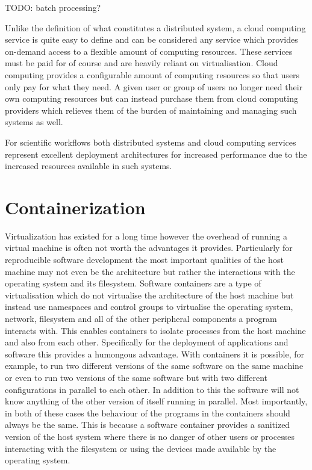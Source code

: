 TODO: batch processing?

Unlike the definition of what constitutes a distributed system, a cloud computing service is quite easy to define and can be considered any service which provides on-demand access to a flexible amount of computing resources. These services must be paid for of course and are heavily reliant on virtualisation. Cloud computing provides a configurable amount of computing resources so that users only pay for what they need. A given user or group of users no longer need their own computing resources but can instead purchase them from cloud computing providers which relieves them of the burden of maintaining and managing such systems as well. 

For scientific workflows both distributed systems and cloud computing services represent excellent deployment architectures for increased performance due to the increased resources available in such systems.

\section{Containerization}
\label{sec:containers}

Virtualization has existed for a long time however the overhead of running a virtual machine is often not worth the advantages it provides. Particularly for reproducible software development the most important qualities of the host machine may not even be the architecture but rather the interactions with the operating system and its filesystem. Software containers are a type of virtualisation which do not virtualise the architecture of the host machine but instead use namespaces and control groups to virtualise the operating system, network, filesystem and all of the other peripheral components a program interacts with. This enables containers to isolate processes from the host machine and also from each other. Specifically for the deployment of applications and software this provides a humongous advantage. With containers it is possible, for example, to run two different versions of the same software on the same machine or even to run two versions of the same software but with two different configurations in parallel to each other. In addition to this the software will not know anything of the other version of itself running in parallel. Most importantly, in both of these cases the behaviour of the programs in the containers should always be the same. This is because a software container provides a sanitized version of the host system where there is no danger of other users or processes interacting with the filesystem or using the devices made available by the operating system.

